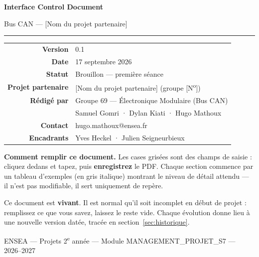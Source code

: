 \documentclass[10pt,a4paper]{article}
\newcommand{\Projet}{[Nom du projet partenaire]}
\newcommand{\NumGroupe}{[N\textsuperscript{o}]}
\newcommand{\Version}{0.1}
\newcommand{\DateVersion}{17 septembre 2026}
\newcommand{\Statut}{Brouillon — première séance}
\begin{document}
\begin{Form}


\begin{titlepage}
  \centering
  \vspace*{2cm}
  {\color{canblue}\Huge\bfseries Interface Control Document\par}
  \vspace{0.4cm}
  {\Large Bus CAN — \Projet\par}
  \vspace{0.3cm}
  {\color{canamber}\rule{0.5\textwidth}{2pt}\par}
  \vspace{2cm}

  \begin{tabular}{@{}r l@{}}
    \textbf{Version} & \Version \\[3pt]
    \textbf{Date} & \DateVersion \\[3pt]
    \textbf{Statut} & \Statut \\[3pt]
    \textbf{Projet partenaire} & \Projet{} (groupe \NumGroupe) \\[3pt]
    \textbf{Rédigé par} & Groupe 69 — Électronique Modulaire (Bus CAN) \\[3pt]
    & Samuel Gomri · Dylan Kiati · Hugo Mathoux \\[3pt]
    \textbf{Contact} & hugo.mathoux@ensea.fr \\[3pt]
    \textbf{Encadrants} & Yves Heckel · Julien Seigneurbieux \\
  \end{tabular}

  \vfill
  \begin{minipage}{0.88\textwidth}
    \small
    \textbf{Comment remplir ce document.} Les cases grisées sont des champs de saisie :
    cliquez dedans et tapez, puis \textbf{enregistrez} le PDF. Chaque section commence par
    un tableau d'exemples (en gris italique) montrant le niveau de détail attendu — il n'est
    pas modifiable, il sert uniquement de repère.

    \medskip
    Ce document est \textbf{vivant}. Il est normal qu'il soit incomplet en début de projet :
    remplissez ce que vous savez, laissez le reste vide. Chaque évolution donne lieu à une
    nouvelle version datée, tracée en section~\ref{sec:historique}.
  \end{minipage}

  \vspace{1.5cm}
  {\small ENSEA — Projets 2\textsuperscript{e} année — Module MANAGEMENT\_PROJET\_S7 — 2026--2027\par}
\end{titlepage}


\end{Form}
\end{document}
